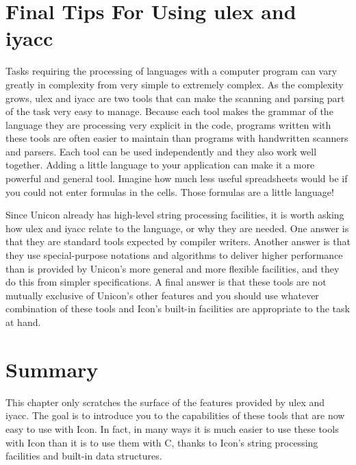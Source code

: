 \section{Final Tips For Using ulex and iyacc}

Tasks requiring the processing of languages with a computer program can
vary greatly in complexity from very simple to extremely complex. As
the complexity grows, \textsf{ulex} and \textsf{iyacc} are two tools
that can make the scanning and parsing part of the task very easy to
manage. Because each tool makes the grammar of the language they are
processing very explicit in the code, programs written with these tools
are often easier to maintain than programs with handwritten scanners
and parsers. Each tool can be used independently and they also work
well together. Adding a little language to your application can make it
a more powerful and general tool. Imagine how much less useful
spreadsheets would be if you could not enter formulas in the cells.
Those formulas are a little language!

Since Unicon already has high-level string processing facilities, it is
worth asking how \textsf{ulex} and \textsf{iyacc} relate to the
language, or why they are needed. One answer is that they are standard
tools expected by compiler writers. Another answer is
that they use special-purpose notations and algorithms to deliver
higher performance than is provided by Unicon's more
general and more flexible facilities, and they do this from simpler
specifications. A final answer is that these tools are not mutually
exclusive of Unicon's other features and you should
use whatever combination of these tools and Icon's
built-in facilities are appropriate to the task at hand.

\section{Summary}

This chapter only scratches the surface of the features provided by
\textsf{ulex} and \textsf{iyacc}. The goal is to introduce you to the
capabilities of these tools that are now easy to use with Icon. In
fact, in many ways it is much easier to use these tools with Icon than
it is to use them with C, thanks to Icon's string
processing facilities and built-in data structures. 


